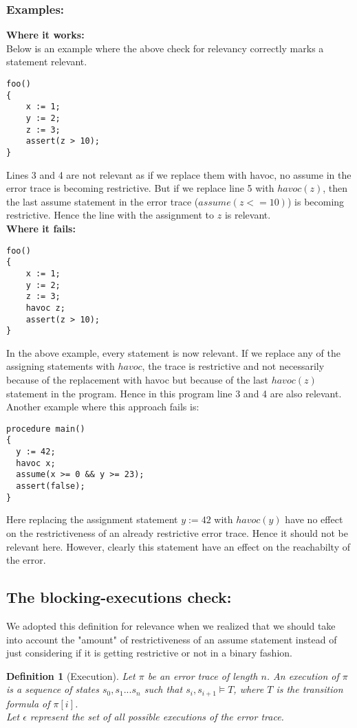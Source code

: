 \documentclass{article}
\newtheorem{mydef}{Definition}
\begin{document}
\subsubsection{Examples:}
\textbf{Where it works:} \\
Below is an example where the above check for relevancy correctly marks a statement relevant.
\begin{lstlisting}
foo()
{
	x := 1;
	y := 2;
	z := 3;
	assert(z > 10);
}
\end{lstlisting}
Lines 3 and 4 are not relevant as if we replace them with havoc, no assume in the error trace is becoming restrictive. But if we replace line 5 with $havoc(z)$, then the last assume statement in the error trace ($assume(z<=10)$) is becoming restrictive. Hence the line with the assignment to $z$ is relevant. \\
\textbf{Where it fails:}
\begin{lstlisting}
foo()
{
	x := 1;
	y := 2;
	z := 3;
	havoc z;
	assert(z > 10);
}
\end{lstlisting}
In the above example, every statement is now relevant. If we replace any of the assigning statements with $havoc$, the trace is restrictive and not necessarily because of the replacement with havoc but because of the last $havoc(z)$ statement in the program. Hence in this program line 3 and 4 are also relevant.\\
Another example where this approach fails is:
\begin{lstlisting}
procedure main()
{
  y := 42;
  havoc x;
  assume(x >= 0 && y >= 23);
  assert(false);
}
\end{lstlisting}
Here replacing the assignment statement $y:=42$ with $havoc(y)$ have no effect on the restrictiveness of an already restrictive error trace. Hence it should not be relevant here. However, clearly this statement have an effect on the reachabilty of the error.

\subsection{The blocking-executions check:}
We adopted this definition for relevance when we realized that we should take into account the "amount" of restrictiveness of an assume statement instead of just considering if it is getting restrictive or not in a binary fashion.
\begin{mydef}[Execution]\label{mydef:execution_definition}
Let $\pi$ be an error trace of length $n$. An execution of $\pi$ is a sequence of states $s_0, s_1...s_n$ such that $s_i, s_{i+1} \models T$, where $T$ is the transition formula of $\pi[i]$. \\
Let $\epsilon$ represent the set of all possible executions of the error trace.
\end{mydef}
\end{document}
